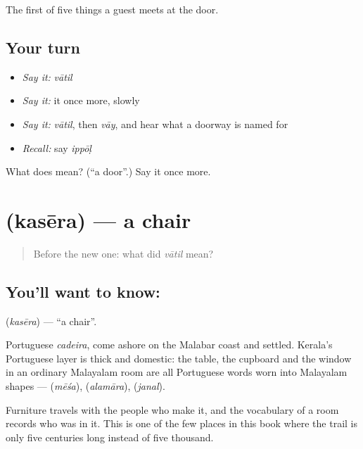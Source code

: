 \begin{grammarlens}[title={What you've built}]
The first of five things a guest meets at the door.
\end{grammarlens}

\subsection*{Your turn}
\begin{itemize}
\raggedright
  \item \emph{Say it:} \emph{vātil}
  \item \emph{Say it:} it once more, slowly
  \item \emph{Say it:} \emph{vātil}, then \emph{vāy}, and hear what a doorway is named for
  \item \emph{Recall:} say \emph{ippōḷ}
\end{itemize}

\begin{tcolorbox}[breakable,colback=teal!4,colframe=teal!35!black,title={Before you move on}]
What does  mean? (\textquotedblleft{}a door\textquotedblright{}.) Say it once more.
\end{tcolorbox}
\section[\texorpdfstring{\ml{കസേര} (kasēra)}{കസേര (kasēra)}]{ (kasēra) — a chair}

\label{lesson:ML-C52-chair}



\begin{quote}
Before the new one: what did \emph{vātil} mean?
\end{quote}

\subsection*{You'll want to know: }
\textbf{} (\emph{kasēra}) — \textquotedblleft{}a chair\textquotedblright{}.

Portuguese \emph{cadeira}, come ashore on the Malabar coast and settled. Kerala's Portuguese layer is thick and domestic: the table, the cupboard and the window in an ordinary Malayalam room are all Portuguese words worn into Malayalam shapes —  (\emph{mēśa}),  (\emph{alamāra}),  (\emph{janal}).

Furniture travels with the people who make it, and the vocabulary of a room records who was in it. This is one of the few places in this book where the trail is only five centuries long instead of five thousand.

